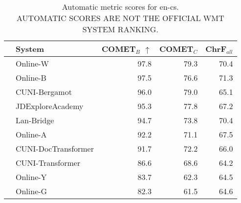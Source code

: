 \begin{table}
\centering
\caption{Automatic metric scores for en-cs. \\AUTOMATIC SCORES ARE NOT THE OFFICIAL WMT SYSTEM RANKING.}
\begin{tabular}{llrrr}
\toprule
          &               System &  COMET$_{B}$ $\uparrow$ &  COMET$_{C}$ &  ChrF$_{all}$ \\
\midrule
 \Uncon{} &             Online-W &                    97.8 &         79.3 &          70.4 \\
 \Uncon{} &             Online-B &                    97.5 &         76.6 &          71.3 \\
 \Const{} &        CUNI-Bergamot &                    96.0 &         79.0 &          65.1 \\
 \Const{} &     JDExploreAcademy &                    95.3 &         77.8 &          67.2 \\
 \Uncon{} &           Lan-Bridge &                    94.7 &         73.8 &          70.4 \\
 \Uncon{} &             Online-A &                    92.2 &         71.1 &          67.5 \\
 \Const{} &  CUNI-DocTransformer &                    91.7 &         72.2 &          66.0 \\
 \Const{} &     CUNI-Transformer &                    86.6 &         68.6 &          64.2 \\
 \Uncon{} &             Online-Y &                    83.7 &         62.3 &          64.5 \\
 \Uncon{} &             Online-G &                    82.3 &         61.5 &          64.6 \\
\bottomrule
\end{tabular}
\end{table}



